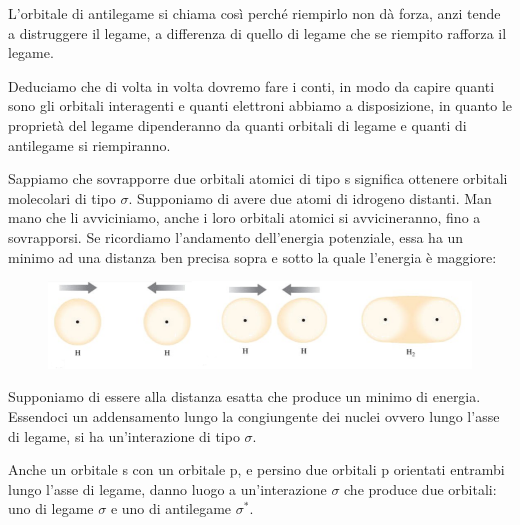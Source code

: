 L'orbitale di antilegame si chiama così perché riempirlo non dà forza, anzi tende a distruggere il legame, a differenza di quello di legame che se riempito rafforza il legame.

Deduciamo che di volta in volta dovremo fare i conti, in modo da capire quanti sono gli orbitali interagenti e quanti elettroni abbiamo a disposizione, in quanto le proprietà del legame dipenderanno da quanti orbitali di legame e quanti di antilegame si riempiranno.

\vspace{0.2cm}Sappiamo che sovrapporre due orbitali atomici di tipo s significa ottenere orbitali molecolari di tipo $\sigma$. Supponiamo di avere due atomi di idrogeno distanti. Man mano che li avviciniamo, anche i loro orbitali atomici si avvicineranno, fino a sovrapporsi. Se ricordiamo l'andamento dell'energia potenziale, essa ha un minimo ad una distanza ben precisa sopra e sotto la quale l'energia è maggiore:

\begin{figure}[htp]
    \centering
    \includegraphics[width=12cm]{immagini/avvicinamento_orbitali.png}
\end{figure}

Supponiamo di essere alla distanza esatta che produce un minimo di energia. Essendoci un addensamento lungo la congiungente dei nuclei ovvero lungo l'asse di legame, si ha un'interazione di tipo $\sigma$.

\vspace{0.2cm}Anche un orbitale s con un orbitale p, e persino due orbitali p orientati entrambi lungo l'asse di legame, danno luogo a un'interazione $\sigma$ che produce due orbitali: uno di legame  $\sigma$ e uno di antilegame  $\sigma^*$.

